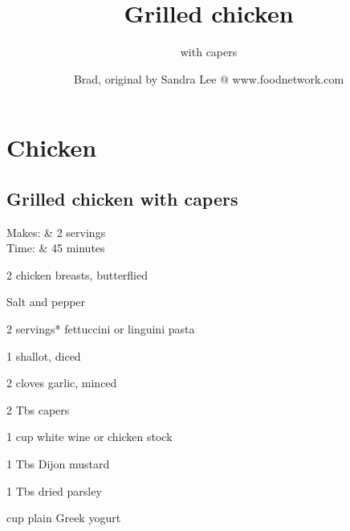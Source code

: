 \documentclass{RecipeBook}
\begin{document}

\section{Chicken}
\subsection{Grilled chicken with capers}
\author{Brad, original by Sandra Lee @ www.foodnetwork.com}
\title{Grilled chicken}
\subtitle{\hspace*{0.4in}with capers}

\begin{info}
	Makes: & 2 servings \\
	Time: & 45 minutes \\
\end{info}


\begin{ingredients*}
	\item{2 chicken breasts, butterflied}
	\item{Salt and pepper}
\end{ingredients*}


\begin{ingredients*}
	\item{2 servings* fettuccini or linguini pasta}
\end{ingredients*}


\pagebreak
{}
\begin{ingredients*}
	\item{1 shallot, diced}
	\item{2 cloves garlic, minced}
	\item{2 Tbs capers}
	\item{1 cup white wine or chicken stock}
	\item{1 Tbs Dijon mustard}
	\item{1 Tbs dried parsley}
	\item{ cup plain Greek yogurt}
\end{ingredients*}
\end{document}

